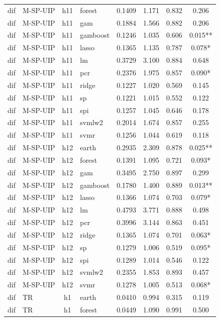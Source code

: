 \begin{ThreePartTable}
\begin{longtable}[t]{llclcccc}
dif & M-SP-UIP & h11 & forest & 0.1409 & 1.171 & 0.832 & 0.206\\
dif & M-SP-UIP & h11 & gam & 0.1884 & 1.566 & 0.882 & 0.206\\
dif & M-SP-UIP & h11 & gamboost & 0.1246 & 1.035 & 0.606 & 0.015**\\
dif & M-SP-UIP & h11 & lasso & 0.1365 & 1.135 & 0.787 & 0.078*\\
dif & M-SP-UIP & h11 & lm & 0.3729 & 3.100 & 0.884 & 0.648\\
dif & M-SP-UIP & h11 & pcr & 0.2376 & 1.975 & 0.857 & 0.090*\\
dif & M-SP-UIP & h11 & ridge & 0.1227 & 1.020 & 0.569 & 0.145\\
dif & M-SP-UIP & h11 & sp & 0.1221 & 1.015 & 0.552 & 0.122\\
dif & M-SP-UIP & h11 & spi & 0.1257 & 1.045 & 0.646 & 0.178\\
dif & M-SP-UIP & h11 & svmlw2 & 0.2014 & 1.674 & 0.857 & 0.255\\
dif & M-SP-UIP & h11 & svmr & 0.1256 & 1.044 & 0.619 & 0.118\\
\addlinespace
dif & M-SP-UIP & h12 & earth & 0.2935 & 2.309 & 0.878 & 0.025**\\
dif & M-SP-UIP & h12 & forest & 0.1391 & 1.095 & 0.721 & 0.093*\\
dif & M-SP-UIP & h12 & gam & 0.3495 & 2.750 & 0.897 & 0.299\\
dif & M-SP-UIP & h12 & gamboost & 0.1780 & 1.400 & 0.889 & 0.013**\\
dif & M-SP-UIP & h12 & lasso & 0.1366 & 1.074 & 0.703 & 0.079*\\
dif & M-SP-UIP & h12 & lm & 0.4793 & 3.771 & 0.888 & 0.498\\
dif & M-SP-UIP & h12 & pcr & 0.3996 & 3.144 & 0.863 & 0.451\\
dif & M-SP-UIP & h12 & ridge & 0.1365 & 1.074 & 0.701 & 0.063*\\
dif & M-SP-UIP & h12 & sp & 0.1279 & 1.006 & 0.519 & 0.095*\\
dif & M-SP-UIP & h12 & spi & 0.1289 & 1.014 & 0.546 & 0.122\\
dif & M-SP-UIP & h12 & svmlw2 & 0.2355 & 1.853 & 0.893 & 0.457\\
dif & M-SP-UIP & h12 & svmr & 0.1278 & 1.005 & 0.513 & 0.068*\\
\addlinespace
dif & TR & h1 & earth & 0.0410 & 0.994 & 0.315 & 0.119\\
dif & TR & h1 & forest & 0.0449 & 1.090 & 0.991 & 0.500\\

\end{longtable}
\end{ThreePartTable}

